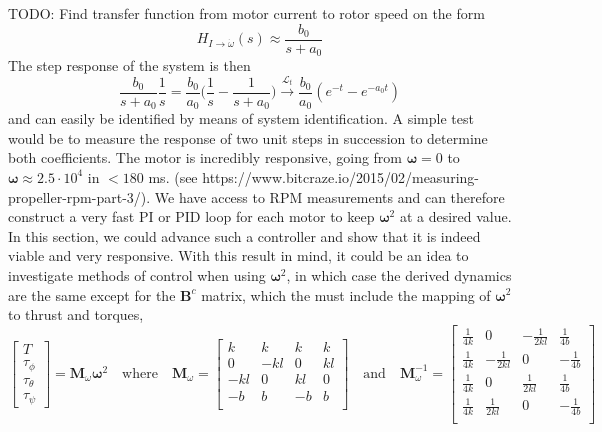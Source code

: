 \documentclass{article}
\begin{document}
TODO: Find transfer function from motor current to rotor speed on the form
\begin{equation}
H_{I\rightarrow \dot{\omega}}(s) \approx \frac{b_0}{s + a_0}
\end{equation}
The step response of the system is then
\begin{equation}
\frac{b_0}{s + a_0} \frac{1}{s} = \frac{b_0}{a_0}\Big(\frac{1}{s} - \frac{1}{s + a_0}\Big) \overset{\mathcal{L}_t}{\longrightarrow}
\frac{b_0}{a_0}(e^{-t} - e^{-a_0t})
\end{equation}
and can easily be identified by means of system identification. A simple test would be to measure the response of two unit steps in succession to determine both coefficients. The motor is incredibly responsive, going from ${\boldsymbol\omega} = 0$ to ${\boldsymbol\omega}\approx 2.5\cdot 10^4$ in $< 180$ ms. (see https://www.bitcraze.io/2015/02/measuring-propeller-rpm-part-3/). We have access to RPM measurements and can therefore construct a very fast PI or PID loop for each motor to keep $\boldsymbol\omega^2$ at a desired value. In this section, we could advance such a controller and show that it is indeed viable and very responsive. With this result in mind, it could be an idea to investigate methods of control when using $\boldsymbol\omega^2$, in which case the derived dynamics are the same except for the $\mathbf{B}^c$ matrix, which the must include the mapping of $\boldsymbol\omega^2$ to thrust and torques,
\begin{equation}
\begin{bmatrix}
T\\
\tau_{\phi}\\
\tau_{\theta}\\
\tau_{\psi}
\end{bmatrix}
=
\mathbf{M}_{\omega}\boldsymbol\omega^2
\quad\text{where}\quad
\mathbf{M}_{\omega} = 
\begin{bmatrix}
    k&    k&   k&   k\\
    0& -kl&   0& kl\\
 -kl&    0& kl&  0\\
   -b&    b&  -b&   b\\
\end{bmatrix}
\quad\text{and}\quad
\mathbf{M}^{-1}_{\omega} = 
\begin{bmatrix}
    \frac{1}{4k}& 0 & -\frac{1}{2kl} &  \frac{1}{4b}\\
    \frac{1}{4k}& -\frac{1}{2kl} & 0 & -\frac{1}{4b}\\
    \frac{1}{4k}& 0 &  \frac{1}{2kl} &  \frac{1}{4b}\\
    \frac{1}{4k}&  \frac{1}{2kl} & 0 & -\frac{1}{4b}\\
\end{bmatrix}
\end{equation}
\end{document}
